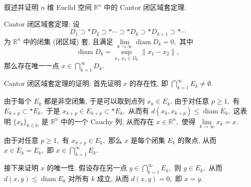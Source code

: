 \begin{question}[points = 10]
叙述并证明 $n$ 维 Euclid 空间 $\mathbb{R}^n$ 中的 Cantor 闭区域套定理.

\end{question}

\begin{solution}
Cantor 闭区域套定理: 设
\[D_1 \supset* D_2 \supset* \cdots \supset* D_k \supset* D_{k+1} \supset* \cdots\]
为 $\mathbb{R}^n$ 中的闭集 (闭区域) 套, 且满足 $\lim\limits_{k \to \infty} \operatorname{diam} D_k = 0,$ 其中
\[\operatorname{diam} D_k = \sup\limits_{x_1, x_2 \in D_k} \lVert x_1 - x_2 \rVert,\]
那么存在唯一一点 $x \in \bigcap\limits_{k=1}^\infty D_k.$

Cantor 闭区域套定理的证明: 首先证明 $x$ 的存在性, 即 $\bigcap\limits_{k=1}^{\infty} E_k \neq \emptyset.$

由于每个 $E_k$ 都是非空闭集, 于是可以取到点列 $x_k \in E_k.$ 由于对任意 $p \geqslant 1,$ 有 $E_{k+p} \subset* E_k,$ 于是 $x_{k+p} \in E_{k+p} \subset* E_k,$ 从而有 $d(x_k, x_{k+p}) \leqslant \operatorname{diam} E_k,$ 这表明 $\{ x_k \}_{k\in\mathbb{N}}$ 是 $\mathbb{R}^n$ 中的一个 Cauchy 列, 从而存在 $x \in \mathbb{R}^n,$ 使得 $\lim\limits_{k\to\infty} x_k = x.$

由于对任意 $p \geqslant 1,$ 有 $x_{k+p} \in E_k,$ 那么 $x$ 是每个闭集 $E_k$ 的聚点, 从而 $x \in \overline{E}_k = E_k,$ 即 $x \in \bigcap\limits_{k=1}^{\infty} E_k.$

接下来证明 $x$ 的唯一性. 假设存在另一点 $y \in \bigcap\limits_{k=1}^{\infty} E_k,$ 则 $y \in E_k,$ 从而 $d(x, y) \leqslant \operatorname{diam} E_k$ 对所有 $k$ 成立, 从而 $d(x, y) = 0,$ 即 $x = y.$
\end{solution}


